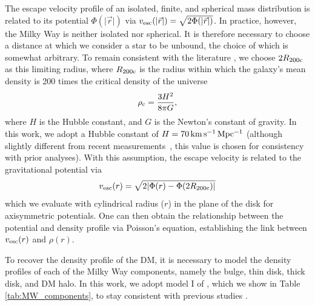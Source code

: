 The escape velocity profile of an isolated, finite, and spherical mass distribution is related to its potential $\Phi(\vert \vec{r} \vert)$ via $v_{\rm{esc}} (\vert \vec{r} \vert) = \sqrt{2\Phi (\vert \vec{r} \vert)}$. In practice, however, the Milky Way is neither isolated nor spherical. It is therefore necessary to choose a distance at which we consider a star to be unbound, the choice of which is somewhat arbitrary. To remain consistent with the literature \citep{deason:2019,Necib2022}, we choose $2R_{200\rm{c}}$ as this limiting radius, where $R_{200\rm{c}}$ is the radius within which the galaxy’s mean density is 200 times the critical density of the universe
\begin{equation}
    \rho_{\rm{c}} = \frac{3 H^2}{8\pi G},
\end{equation}
where $H$ is the Hubble constant, and $G$ is the Newton's constant of gravity.
In this work, we adopt a Hubble constant of $H = 70\,\rm{km\,s^{-1}\,Mpc^{-1}}$ (although slightly different from recent measurements~\citep{ade:2016}, this value is chosen for consistency with prior analyses). With this assumption, the escape velocity is related to the gravitational potential via 
\begin{equation}
    \vesc (r) = \sqrt{2\vert \Phi (r) - \Phi(2R_{200\rm{c}})\vert}
\end{equation}
which we evaluate with cylindrical radius ($r$) in the plane of the disk for axisymmetric potentials. One can then obtain the relationship between the potential and density profile via Poisson's equation, establishing the link between $v_{\rm{esc}}(r)$ and $\rho(r)$. 

To recover the density profile of the DM, it is necessary to model the density profiles of each of the Milky Way components, namely the bulge, thin disk, thick disk, and DM halo. In this work, we adopt model I of \cite{pouliasis:2017}, which we show in Table \ref{tab:MW_components}, to stay consistent with previous studies \citep{deason:2019, Necib2022}.
 

